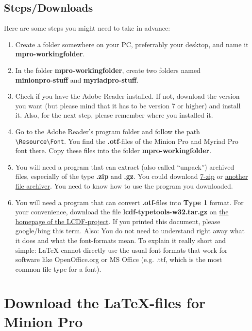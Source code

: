 \subsection{Steps/Downloads}

Here are some steps you might need to take in advance:
\begin{enumerate}
	\item Create a folder somewhere on your PC, preferrably your desktop, and name it\\
	\textbf{mpro-workingfolder}.
	\item In the folder \textbf{mpro-workingfolder}, create two folders named\\
	\textbf{minionpro-\-stuff} and \textbf{myriadpro-\-stuff}.
	\item Check if you have the Adobe Reader installed. If not, download the version you want (but please mind that it has to be version 7 or higher) and install it. Also, for the next step, please remember where you installed it.
	\item Go to the Adobe Reader's program folder and follow the path \verb+\Resource\Font+. You find the \textbf{.otf}-files of the Minion Pro and Myriad Pro font there. Copy these files into the folder \textbf{mpro-workingfolder}.
	\item You will need a program that can extract (also called ``unpack'') archived files, especially of the type \textbf{.zip} and \textbf{.gz}. You could download \href{http://www.google.com/search?\&q=7-zip}{7-zip} or \href{http://en.wikipedia.org/wiki/Comparison_of_file_archivers}{another file archiver}. You need to know how to use the program you downloaded.
	\item You will need a program that can convert \textbf{.otf}-files into \textbf{Type 1} format. For your convenience, download the file \textbf{lcdf-typetools-w32.tar.gz} on \href{http://www.lcdf.org/type/}{the homepage of the LCDF-project}. If you printed this document, please google/bing this term. Also: You do not need to understand right away what it does and what the font-formats mean. To explain it really short and simple: \LaTeX{} cannot directly use the usual font formats that work for software like OpenOffice.org or MS Office (e.g. .ttf, which is the most common file type for a font).
\end{enumerate}

\section{Download the LaTeX-files for Minion Pro}\label{sec:download-minion}

